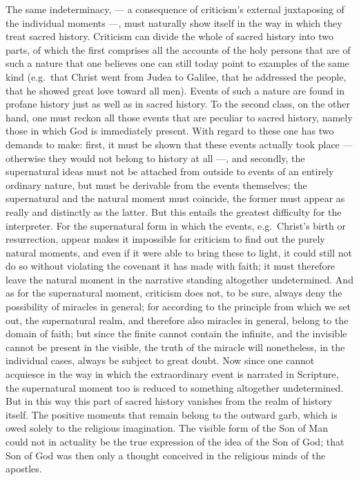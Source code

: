 \documentclass[12pt]{book}
\newcommand{\opage}[1]{\marginnote{\footnotesize\textit{[#1]}}}
\begin{document}
The same indeterminacy, --- a consequence of criticism's external juxtaposing
of the individual moments ---, must naturally show itself in the way in which
they treat sacred history. Criticism can divide the whole of sacred history
into two parts, of which the first comprises all the accounts of the holy
persons that are of such a nature that one believes one can still today point
to examples of the same kind (e.g.\ that Christ went from Judea to Galilee,
that he addressed the people, that he showed great love toward all men).
Events of such a nature are found in profane history just as well as in sacred
history. To the second class, on the other hand, one must reckon all those
events
\opage{117} that are peculiar to sacred history, namely those in which God is immediately
present. With regard to these one has two demands to make: first, it must be
shown that these events actually took place --- otherwise they would not
belong to history at all ---, and secondly, the supernatural ideas must not be
attached from outside to events of an entirely ordinary nature, but must be
derivable from the events themselves; the supernatural and the natural moment
must coincide, the former must appear as really and distinctly as the latter.
But this entails the greatest difficulty for the interpreter. For the
supernatural form in which the events, e.g.\ Christ's birth or resurrection,
appear makes it impossible for criticism to find out the purely natural
moments, and even if it were able to bring these to light, it could still not
do so without violating the covenant it has made with faith; it must
therefore leave the natural moment in the narrative standing altogether
undetermined. And as for the supernatural moment, criticism does not, to be
sure, always deny the possibility of miracles in general; for according to the
principle from which we set out, the supernatural realm, and therefore also
miracles in general, belong to the domain of faith; but since the finite
cannot contain the infinite, and the invisible cannot be present in the
visible, the truth of the miracle will nonetheless, in the individual cases,
always be subject to great doubt. Now since one cannot acquiesce in the way in
which the extraordinary event is narrated in Scripture, the supernatural
moment too is reduced to something altogether undetermined. But in this way
this part of sacred history vanishes from the realm of history itself. The
positive moments that remain belong to the outward garb, which is owed solely
to the religious imagination. The visible form of the Son of Man
\opage{118} could not in actuality be the true expression of the idea of the Son of God;
that Son of God was then only a thought conceived in the religious minds of the
apostles.
\end{document}

